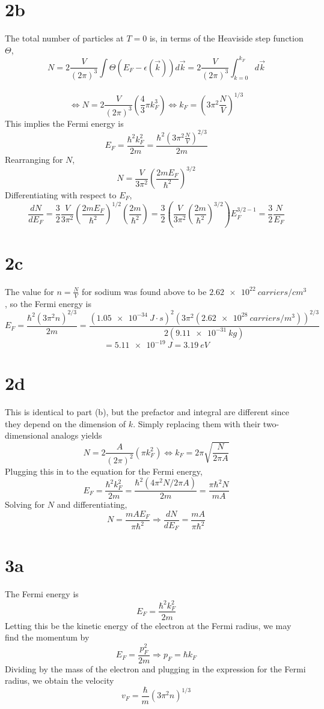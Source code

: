 \documentclass{article}
\begin{document}
\section*{2b}
The total number of particles at $T=0$ is, in terms of the Heaviside step function $\Theta$,
\[N=2\frac{V}{(2\pi)^{3}}\int\Theta(E_{F}-\epsilon(\vec{k}))d\vec{k}=2\frac{V}{(2\pi)^{3}}\int_{k=0}^{k_{F}}d\vec{k}\]
\
\[\Leftrightarrow N=2\frac{V}{(2\pi)^{3}}\left( \frac{4}{3}\pi k_{F}^{3} \right)\Leftrightarrow k_{F}=\left( 3\pi^{2}\frac{N}{V} \right)^{1/3}\]
This implies the Fermi energy is
\[E_{F}=\frac{\hbar^{2}k_{F}^{2}}{2m}=\frac{\hbar^{2}(3\pi^{2}\frac{N}{V})^{2/3}}{2m}\]
Rearranging for $N$,
\[N=\frac{V}{3\pi^{2}}\left( \frac{2mE_{F}}{\hbar^{2}} \right)^{3/2}\]
Differentiating with respect to $E_{F}$,
\[\frac{dN}{dE_{F}}=\frac{3}{2}\frac{V}{3\pi^{2}}\left( \frac{2mE_{F}}{\hbar^{2}} \right)^{1/2}\left( \frac{2m}{\hbar^{2}} \right)=\frac{3}{2}\left( \frac{V}{3\pi^{2}}\left( \frac{2m}{\hbar^{2}} \right)^{3/2} \right)E_{F}^{{3/2 - 1}}=\frac{3}{2}\frac{N}{E_{F}}\]

\section*{2c}
The value for $n=\frac{N}{V}$ for sodium was found above to be $\SI{2.62e22}{carriers/cm^{3}}$, so the Fermi energy is
\[E_{F}=\frac{\hbar^{2}\left( 3\pi^{2}n \right)^{{2/3}}}{2m}=\frac{(\SI{1.05e-34}{J\cdot s})^{2}\left( 3\pi^{2}(\SI{2.62e28}{carriers/m^{3}}) \right)^{2/3}}{2(\SI{9.11e-31}{kg})}\]\[=\SI{5.11e-19}{J}=\SI{3.19}{eV}\]

\section*{2d}
This is identical to part (b), but the prefactor and integral are different since they depend on the dimension of $k$. Simply replacing them with their two-dimensional analogs yields
\[N=2\frac{A}{(2\pi)^{2}}\left( \pi k_{F}^{2} \right)\Leftrightarrow k_{F}=2\pi\sqrt{\frac{N}{2\pi A}}\]
Plugging this in to the equation for the Fermi energy,
\[E_{F}=\frac{\hbar^{2}k_{F}^{2}}{2m}=\frac{\hbar^{2}(4\pi^{2}N/2\pi A)}{2m}=\frac{\pi\hbar^{2}N}{mA}\]
Solving for $N$ and differentiating,
\[N=\frac{mAE_{F}}{\pi\hbar^{2}}\Rightarrow \frac{dN}{dE_{F}}=\frac{mA}{\pi\hbar^{2}}\]

\section*{3a}
The Fermi energy is
\[E_{F}=\frac{\hbar^{2}k_{F}^{2}}{2m}\]
Letting this be the kinetic energy of the electron at the Fermi radius, we may find the momentum by
\[E_{F}=\frac{p_{F}^{2}}{2m}\Rightarrow p_{F}=\hbar k_{F}\]
Dividing by the mass of the electron and plugging in the expression for the Fermi radius, we obtain the velocity
\[v_{F}=\frac{\hbar}{m}\left( 3\pi^{2}n \right)^{1/3}\]
\end{document}

